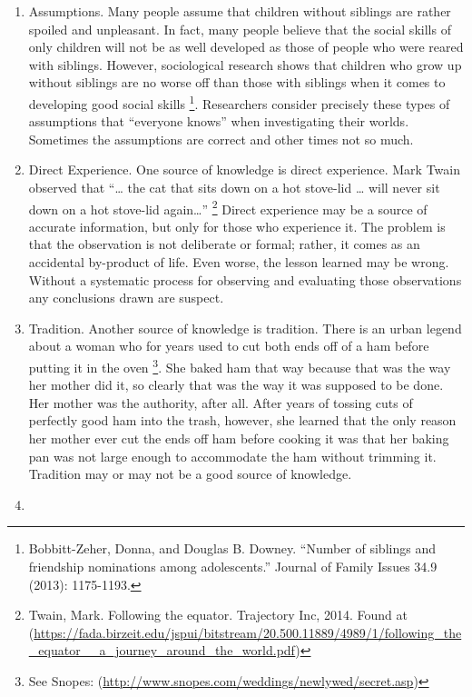 \documentclass[]{book}
\let\rmarkdownfootnote\footnote%
\def\footnote{\protect\rmarkdownfootnote}
\theoremstyle{definition}
\theoremstyle{definition}
\theoremstyle{definition}
\theoremstyle{remark}
\begin{document}
\begin{enumerate}
\def\labelenumi{\arabic{enumi}.}
\item
  Assumptions. Many people assume that children without siblings are
  rather spoiled and unpleasant. In fact, many people believe that the
  social skills of only children will not be as well developed as those
  of people who were reared with siblings. However, sociological
  research shows that children who grow up without siblings are no worse
  off than those with siblings when it comes to developing good social
  skills \footnote{Bobbitt-Zeher, Donna, and Douglas B. Downey. ``Number
    of siblings and friendship nominations among adolescents.'' Journal
    of Family Issues 34.9 (2013): 1175-1193.}. Researchers consider
  precisely these types of assumptions that ``everyone knows'' when
  investigating their worlds. Sometimes the assumptions are correct and
  other times not so much.
\item
  Direct Experience. One source of knowledge is direct experience. Mark
  Twain observed that ``\ldots{} the cat that sits down on a hot
  stove-lid \ldots{} will never sit down on a hot stove-lid
  again\ldots{}'' \footnote{Twain, Mark. Following the equator.
    Trajectory Inc, 2014. Found at
    (\url{https://fada.birzeit.edu/jspui/bitstream/20.500.11889/4989/1/following_the_equator__a_journey_around_the_world.pdf})}
  Direct experience may be a source of accurate information, but only
  for those who experience it. The problem is that the observation is
  not deliberate or formal; rather, it comes as an accidental by-product
  of life. Even worse, the lesson learned may be wrong. Without a
  systematic process for observing and evaluating those observations any
  conclusions drawn are suspect.
\item
  Tradition. Another source of knowledge is tradition. There is an urban
  legend about a woman who for years used to cut both ends off of a ham
  before putting it in the oven \footnote{See Snopes:
    (\url{http://www.snopes.com/weddings/newlywed/secret.asp})}. She
  baked ham that way because that was the way her mother did it, so
  clearly that was the way it was supposed to be done. Her mother was
  the authority, after all. After years of tossing cuts of perfectly
  good ham into the trash, however, she learned that the only reason her
  mother ever cut the ends off ham before cooking it was that her baking
  pan was not large enough to accommodate the ham without trimming it.
  Tradition may or may not be a good source of knowledge.
\item

\end{enumerate}
\end{document}
